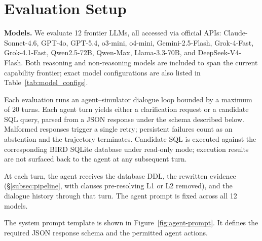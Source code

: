\section{Evaluation Setup}
\label{app:evaluation-setup}

\noindent\textbf{Models.} We evaluate 12 frontier LLMs, all accessed via official APIs: Claude-Sonnet-4.6, GPT-4o, GPT-5.4, o3-mini, o4-mini, Gemini-2.5-Flash, Grok-4-Fast, Grok-4.1-Fast, Qwen2.5-72B, Qwen-Max, Llama-3.3-70B, and DeepSeek-V4-Flash. Both reasoning and
non-reasoning models are included to span the current capability frontier; exact model configurations are also listed in Table~\ref{tab:model_configs}.

 Each evaluation runs an agent--simulator dialogue loop bounded by a maximum of 20 turns. Each agent turn yields either a clarification request or a candidate SQL query, parsed from a JSON response under the schema described below. Malformed responses trigger a single retry; persistent failures count as an abstention and the trajectory terminates. Candidate SQL is executed against the corresponding BIRD SQLite database under read-only mode; execution results are not surfaced back to the agent at any subsequent turn.

 At each turn, the agent receives the database DDL, the rewritten
evidence (\S\ref{subsec:pipeline}, with clauses pre-resolving L1 or L2 removed), and the dialogue history through that turn. The agent prompt is fixed across all 12 models.

The system prompt template is shown in
Figure~\ref{fig:agent-prompt}. It defines the required JSON response
schema and the permitted agent actions.

